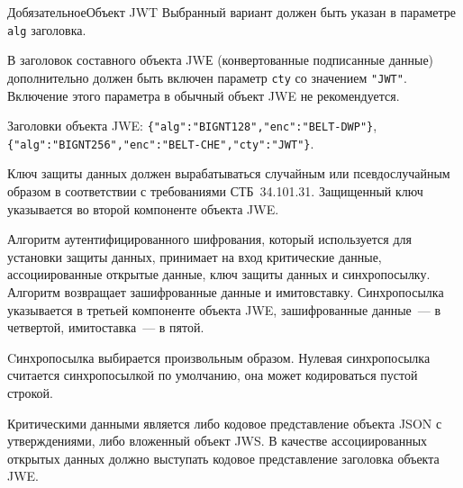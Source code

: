 \begin{appendix}{Д}{обязательное}{Объект JWT}
Выбранный вариант должен быть указан в параметре \lstinline{alg} заголовка. 

В заголовок составного объекта JWЕ (конвертованные подписанные данные) 
дополнительно должен быть включен параметр \lstinline{cty} со значением 
\lstinline{"JWT"}. 
%
Включение этого параметра в обычный объект JWE не рекомендуется.

\begin{example*}
Заголовки объекта JWE: 
\lstinline|{"alg":"BIGNT128","enc":"BELT-DWP"}|,
\lstinline|{"alg":"BIGNT256","enc":"BELT-CHE","cty":"JWT"}|.
\end{example*}

Ключ защиты данных должен вырабатываться случайным или псевдослучайным образом 
в соответствии с требованиями СТБ~34.101.31.
%
Защищенный ключ указывается во второй компоненте объекта JWE.

Алгоритм аутентифицированного шифрования, который используется для установки 
защиты данных, принимает на вход критические данные, ассоциированные открытые 
данные, ключ защиты данных и синхропосылку. Алгоритм возвращает зашифрованные 
данные и имитовставку.
%
Синхропосылка указывается в третьей компоненте объекта JWE, зашифрованные 
данные~--- в четвертой, имитоставка~--- в пятой.

Cинхропосылка выбирается произвольным образом.
%
Нулевая синхропосылка считается синхропосылкой по умолчанию, она может 
кодироваться пустой строкой.

Критическими данными является либо кодовое представление объекта JSON с 
утверждениями, либо вложенный объект JWS. 
%
В качестве ассоциированных открытых данных должно выступать кодовое 
представление заголовка объекта JWE.

\end{appendix}
